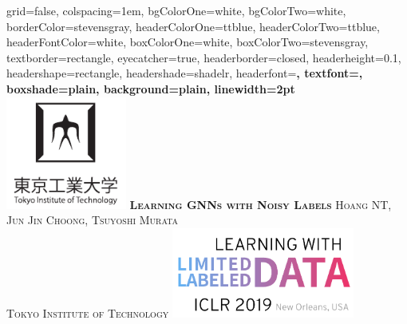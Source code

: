 \documentclass[portrait,final,archD,fontscale=0.477]{baposter}
\begin{document}


\begin{poster}%
  {
  grid=false,
  colspacing=1em,
  bgColorOne=white,
  bgColorTwo=white,
  borderColor=stevensgray,
  headerColorOne=ttblue,
  headerColorTwo=ttblue,
  headerFontColor=white,
  boxColorOne=white,
  boxColorTwo=stevensgray,
  textborder=rectangle,
  eyecatcher=true,
  headerborder=closed,
  headerheight=0.1\textheight,
  headershape=rectangle,
  headershade=shadelr,
  headerfont=\Large\bf\textsc, %
  textfont={\setlength{\parindent}{1.5em}},
  boxshade=plain,
  background=plain,
  linewidth=2pt
  }
  {%
    \includegraphics[height=10.0em]{img/tokyotech_logo}
  }
  {\bf \Huge \textsc{Learning GNNs with Noisy Labels} }
  {\vspace{0.5em} \textsc{ Hoang NT, Jun Jin Choong, Tsuyoshi Murata \\ \vspace{0.2em} Tokyo Institute of Technology}}
  {%
    \includegraphics[height=8.0em]{img/lld_logo}
  }


\end{poster}
\end{document}
